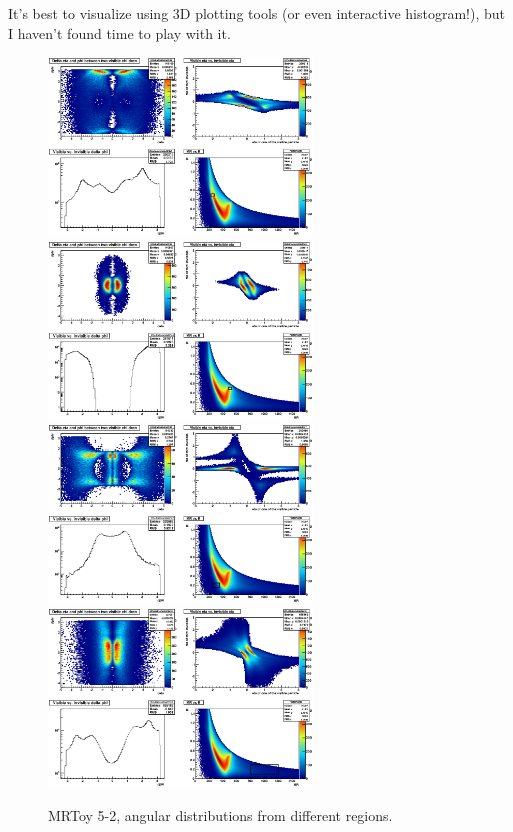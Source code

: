 \documentclass{fheadnote}
\begin{document}
It's best to visualize using 3D plotting tools (or even interactive histogram!), but I haven't found time to play with it.

\begin{figure}[htbp]
   \centering
   \includegraphics[width=7cm]{Figures/MRToy5_2_Region1}
   \includegraphics[width=7cm]{Figures/MRToy5_2_Region2}\\
   \includegraphics[width=7cm]{Figures/MRToy5_2_Region3}
   \includegraphics[width=7cm]{Figures/MRToy5_2_Region4}
   \caption{MRToy 5-2, angular distributions from different regions.}
   \label{Figure_MRToy5_2}
\end{figure}
\end{document}
